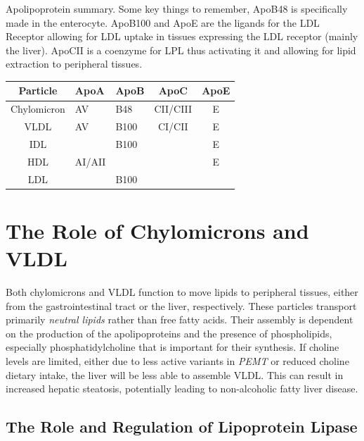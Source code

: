 \documentclass{tufte-handout}
\begin{document}
\begin{margintable}
\centering
\caption{Apolipoprotein summary.  Some key things to remember, ApoB48 is specifically made in the enterocyte.  ApoB100 and ApoE are the ligands for the LDL Receptor allowing for LDL uptake in tissues expressing the LDL receptor (mainly the liver).  ApoCII is a coenzyme for LPL thus activating it and allowing for lipid extraction to peripheral tissues.}
\label{tab:apolipoproteins}
\begin{tabular}{@{}cllcc@{}}
\toprule
\textbf{Particle} & \textbf{ApoA} & \textbf{ApoB} & \textbf{ApoC} & \textbf{ApoE} \\ \midrule
Chylomicron       &  AV         & B48           & CII/CIII           & E             \\
VLDL              &   AV            & B100          & CI/CII        & E             \\
IDL               &                  & B100         &        &   E \\
HDL               & AI/AII          &           &               &             E  \\
LDL               &         & B100          &               &              
\end{tabular}
\end{margintable}
\section{The Role of Chylomicrons and VLDL}

Both chylomicrons and VLDL function to move lipids to peripheral tissues, either from the gastrointestinal tract or the liver, respectively.  These particles transport primarily \emph{neutral lipids} rather than free fatty acids.  Their assembly is dependent on the production of the apolipoproteins and the presence of phospholipids, especially phosphatidylcholine that is important for their synthesis.   If choline levels are limited, either due to less active variants in \textit{PEMT} or reduced choline dietary intake, the liver will be less able to assemble VLDL.  This can result in increased hepatic steatosis, potentially leading to non-alcoholic fatty liver disease.

\subsection{The Role and Regulation of Lipoprotein Lipase}
\end{document}

